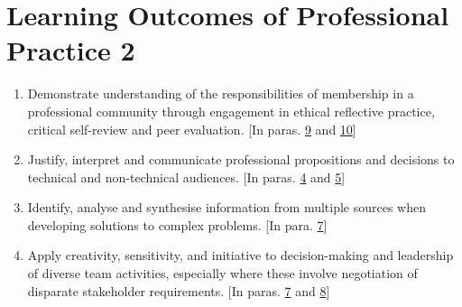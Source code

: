 \documentclass[12pt,a4paper]{article}
\newcommand{\refpa}[1]{\hyperlink{para#1}{#1}}
\begin{document}
\section*{Learning Outcomes of Professional Practice 2}
\begin{enumerate}[start=6]
\item\label{lo6} Demonstrate understanding of the responsibilities of membership in a professional community through engagement in ethical reflective practice, critical self-review and peer evaluation.  [In paras. \refpa{9} and \refpa{10}]
\item\label{lo7} Justify, interpret and communicate professional propositions and decisions to technical and non-technical audiences.  [In paras. \refpa{4} and \refpa{5}]
\item\label{lo8} Identify, analyse and synthesise information from multiple sources when developing solutions to complex problems.  [In para. \refpa{7}]
\item\label{lo9} Apply creativity, sensitivity, and initiative to decision-making and leadership of diverse team activities, especially where these involve negotiation of disparate stakeholder requirements.  [In paras. \refpa{7} and \refpa{8}]
\end{enumerate}
\end{document}
